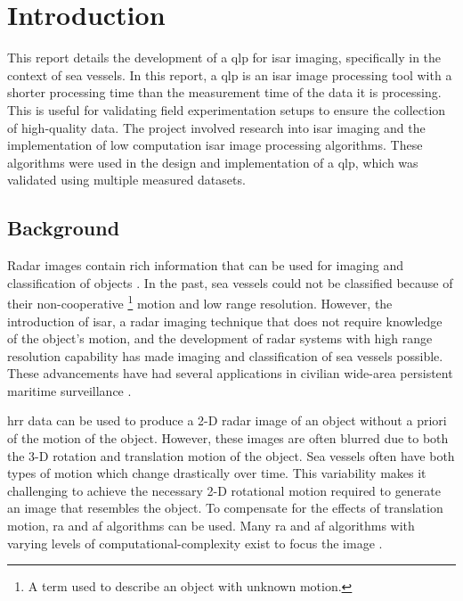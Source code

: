 \documentclass[class=report,11pt,crop=false]{standalone}
\begin{document}
\chapter{Introduction}
This report details the development of a \gls{qlp} for \gls{isar} imaging, specifically in the context of sea vessels. In this report, a \gls{qlp} is an \gls{isar} image processing tool with a shorter processing time than the measurement time of the data it is processing. This is useful for validating field experimentation setups to ensure the collection of high-quality data. The project involved research into \gls{isar} imaging and the implementation of low computation \gls{isar} image processing algorithms. These algorithms were used in the design and implementation of a \gls{qlp}, which was validated using multiple measured datasets.

\section{Background}
Radar images contain rich information that can be used for imaging and classification of objects \cite{ISARtextbook_Martorella}. In the past, sea vessels could not be classified because of their non-cooperative \footnote{A term used to describe an object with unknown motion.} motion and low range resolution. However, the introduction of \gls{isar}, a radar imaging technique that does not require knowledge of the object's motion, and the development of radar systems with high range resolution capability has made imaging and classification of sea vessels possible. These advancements have had several applications in civilian wide-area persistent maritime surveillance \cite{quick-look_detection}. 

\gls{hrr} data can be used to produce a 2-D radar image of an object without a priori of the motion of the object. However, these images are often blurred due to both the 3-D rotation and translation motion of the object. Sea vessels often have both types of motion which change drastically over time. This variability makes it challenging to achieve the necessary 2-D rotational motion required to generate an image that resembles the object. To compensate for the effects of translation motion, \gls{ra} and \gls{af} algorithms can be used. Many \gls{ra} and \gls{af} algorithms with varying levels of computational-complexity exist to focus the image \cite{ISARtextbook_Martorella,ISARtextbook_Matlab}.
\end{document}
